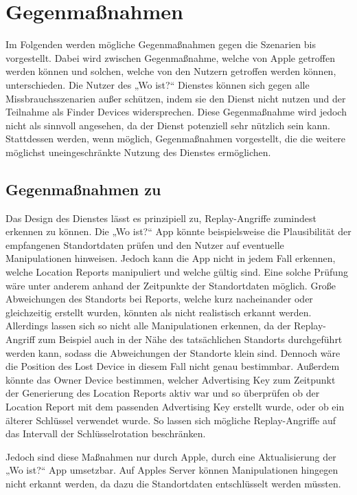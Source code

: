\section{Gegenmaßnahmen}
\label{sec:Gegenmassnahmen}

Im Folgenden werden mögliche Gegenmaßnahmen gegen die Szenarien  bis  vorgestellt.
Dabei wird zwischen Gegenmaßnahme, welche von Apple getroffen werden können und solchen, welche von den Nutzern getroffen werden können, unterschieden.
Die Nutzer des „Wo ist?“ Dienstes können sich gegen alle Missbrauchsszenarien außer  schützen, indem sie den Dienst nicht nutzen und der Teilnahme als Finder Devices widersprechen.
Diese Gegenmaßnahme wird jedoch nicht als sinnvoll angesehen, da der Dienst potenziell sehr nützlich sein kann.
Stattdessen werden, wenn möglich, Gegenmaßnahmen vorgestellt, die die weitere möglichst uneingeschränkte Nutzung des Dienstes ermöglichen.


\subsection{Gegenmaßnahmen zu }
Das Design des Dienstes lässt es prinzipiell zu, Replay-Angriffe zumindest erkennen zu können.
Die „Wo ist?“ App könnte beispielsweise die Plausibilität der empfangenen Standortdaten prüfen und den Nutzer auf eventuelle Manipulationen hinweisen.
Jedoch kann die App nicht in jedem Fall erkennen, welche Location Reports manipuliert und welche gültig sind.
Eine solche Prüfung wäre unter anderem anhand der Zeitpunkte der Standortdaten möglich.
Große Abweichungen des Standorts bei Reports, welche kurz nacheinander oder gleichzeitig erstellt wurden, könnten als nicht realistisch erkannt werden.
Allerdings lassen sich so nicht alle Manipulationen erkennen, da der Replay-Angriff zum Beispiel auch in der Nähe des tatsächlichen Standorts durchgeführt werden kann, sodass die Abweichungen der Standorte klein sind.
Dennoch wäre die Position des Lost Device in diesem Fall nicht genau bestimmbar.
Außerdem könnte das Owner Device bestimmen, welcher Advertising Key zum Zeitpunkt der Generierung des Location Reports aktiv war und so überprüfen ob der Location Report mit dem passenden Advertising Key erstellt wurde, oder ob ein älterer Schlüssel verwendet wurde.
So lassen sich mögliche Replay-Angriffe auf das Intervall der Schlüsselrotation beschränken.

Jedoch sind diese Maßnahmen nur durch Apple, durch eine Aktualisierung der „Wo ist?“ App umsetzbar. 
Auf Apples Server können Manipulationen hingegen nicht erkannt werden, da dazu die Standortdaten entschlüsselt werden müssten.

